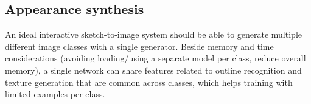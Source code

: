 \subsection{Appearance synthesis}
An ideal interactive sketch-to-image system  should be able to generate multiple different image classes with a single generator. 
Beside memory and time considerations (avoiding loading/using a separate model per class, reduce overall memory), a single network can share features related to outline recognition and texture generation that are common across classes, which helps training with limited examples per class. %

